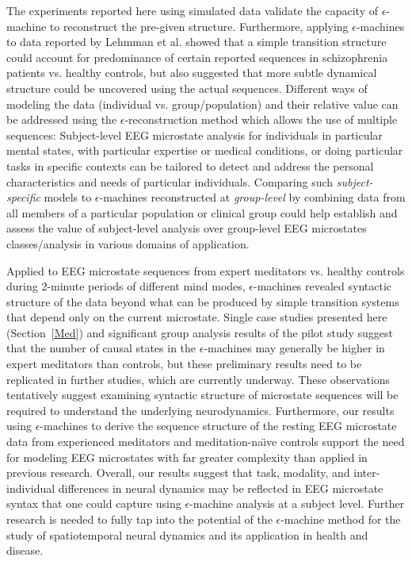\documentclass[journal]{IEEEtran}
\begin{document}
 The experiments reported here using simulated data validate the capacity of $\epsilon$-machine to reconstruct the pre-given structure. Furthermore, applying $\epsilon$-machines to data reported by Lehmman et al. \cite{Lehmann2005} showed that a simple transition structure could account for predominance of certain reported sequences in schizophrenia patients vs. healthy controls, but also suggested that more subtle dynamical structure could be uncovered using the actual sequences. 
 Different ways of modeling the data (individual vs. group/population) and their relative value can be addressed using the $\epsilon$-reconstruction method which allows the use
 of multiple sequences:  Subject-level EEG microstate analysis for individuals in particular mental states, with particular expertise or medical conditions, or doing particular tasks in specific contexts can be tailored  to detect and address the personal characteristics and needs of particular individuals.   Comparing such {\em subject-specific} models to $\epsilon$-machines reconstructed  at {\em group-level} by combining data from all members of a particular population or clinical group could help establish and assess the value of subject-level analysis over group-level EEG microstates classes/analysis in various domains of application.
 
Applied to EEG microstate sequences from expert meditators vs. healthy controls during 2-minute periods of different mind modes, $\epsilon$-machines revealed syntactic structure of the data beyond what can be produced by simple transition systems that depend only on the current microstate. Single case studies presented here (Section~\ref{Med}) and significant group analysis results of the pilot study \cite{GwynThesis} suggest that the number of causal states in the $\epsilon$-machines may generally be higher in expert meditators than controls, but these preliminary results need to be replicated in further studies, which are currently underway.
  These observations tentatively suggest examining syntactic structure of microstate sequences will be required to understand the underlying neurodynamics. 
Furthermore, our results using $\epsilon$-machines to derive the sequence structure of the resting EEG microstate data from experienced meditators and meditation-na\"{\i}ve controls support the need for modeling EEG microstates with far greater complexity than applied in previous research.  Overall, our results suggest that task, modality, and inter-individual differences in neural dynamics may be reflected in EEG microstate syntax that one could capture using $\epsilon$-machine analysis at a subject level. 
Further research is needed to fully tap into the potential of the $\epsilon$-machine method for the study of spatiotemporal neural dynamics and its application in health and disease.   
\end{document}
